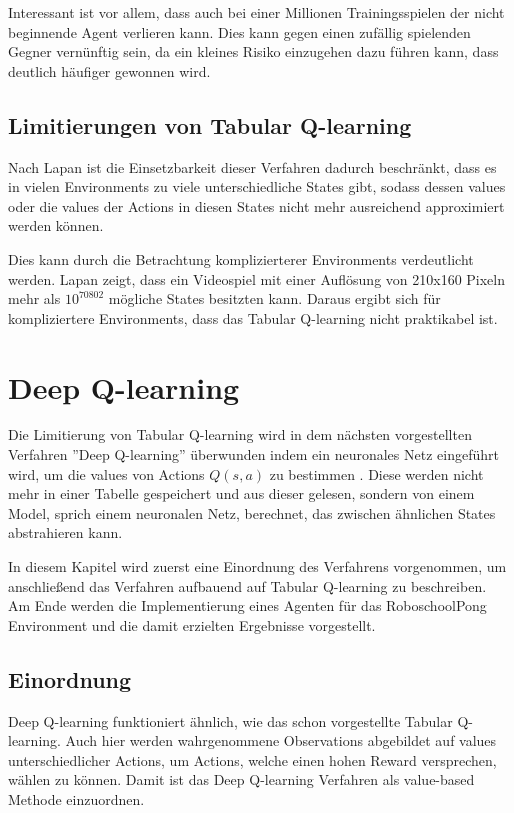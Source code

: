 \documentclass[11pt]{scrartcl}
\begin{document}
Interessant ist vor allem, dass auch bei einer Millionen Trainingsspielen der nicht
beginnende Agent verlieren kann. Dies kann gegen einen zufällig spielenden Gegner
vernünftig sein, da ein kleines Risiko einzugehen dazu führen kann, dass deutlich häufiger
gewonnen wird. %


\subsection{Limitierungen von Tabular Q-learning}
\label{sec:tabular_q_learning_limits}
Nach Lapan\cite[~S.192]{L2018} ist die Einsetzbarkeit dieser Verfahren dadurch
beschränkt, dass es in vielen Environments zu viele unterschiedliche States gibt, sodass
dessen values oder die values der Actions in diesen States nicht mehr ausreichend
approximiert werden können.

Dies kann durch die Betrachtung komplizierterer Environments verdeutlicht werden. Lapan
\cite[~S.192]{L2018} zeigt, dass ein Videospiel mit einer Auflösung von 210x160 Pixeln
mehr als $10^{70802}$ mögliche States besitzten kann. Daraus ergibt sich für
kompliziertere Environments, dass das Tabular Q-learning nicht praktikabel ist.

\newpage
\section{Deep Q-learning}
\label{sec:dqn}
Die Limitierung von Tabular Q-learning wird in dem nächsten vorgestellten Verfahren
''Deep Q-learning'' überwunden indem ein neuronales Netz eingeführt wird, um die values
von Actions $Q(s, a)$ zu bestimmen \cite[~S.199 ff.]{L2018}. Diese werden nicht mehr in
einer Tabelle gespeichert und aus dieser gelesen, sondern von einem Model, sprich einem
neuronalen Netz, berechnet, das zwischen ähnlichen States abstrahieren kann.

In diesem Kapitel wird zuerst eine Einordnung des Verfahrens vorgenommen, um anschließend
das Verfahren aufbauend auf Tabular Q-learning zu beschreiben. Am Ende werden die	
Implementierung eines Agenten für das RoboschoolPong Environment und die damit erzielten
Ergebnisse vorgestellt.

\subsection{Einordnung}
Deep Q-learning funktioniert ähnlich, wie das schon vorgestellte Tabular Q-learning. Auch
hier werden wahrgenommene Observations abgebildet auf values unterschiedlicher Actions, um
Actions, welche einen hohen Reward versprechen, wählen zu können. Damit ist das Deep 
Q-learning Verfahren als value-based Methode einzuordnen.
\end{document}
